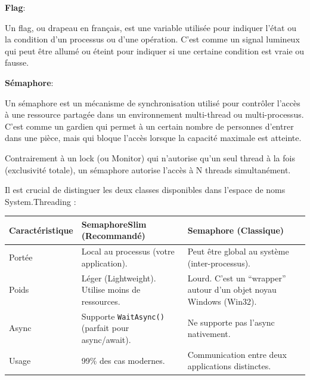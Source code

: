 \vspace{0.5cm}

\noindent \textbf{Flag}:

\noindent Un flag, ou drapeau en français, est une variable utilisée pour indiquer l'état ou la condition d'un processus ou d'une opération. C'est comme un signal lumineux qui peut être allumé ou éteint pour indiquer si une certaine condition est vraie ou fausse.

\newpage

\noindent \textbf{Sémaphore}:

\noindent Un sémaphore est un mécanisme de synchronisation utilisé pour contrôler l'accès à une ressource partagée dans un environnement multi-thread ou multi-processus. C'est comme un gardien qui permet à un certain nombre de personnes d'entrer dans une pièce, mais qui bloque l'accès lorsque la capacité maximale est atteinte.

\noindent Contrairement à un lock (ou Monitor) qui n'autorise qu'un seul thread à la fois (exclusivité totale), un sémaphore autorise l'accès à N threads simultanément.

\vspace{0.5cm}

\noindent Il est crucial de distinguer les deux classes disponibles dans l'espace de noms System.Threading :

\vspace{0.5cm}

\begin{center}
\begin{tabular}{|p{}|p{}|p{}|}
\hline
\textbf{Caractéristique} & \textbf{SemaphoreSlim (Recommandé)} & \textbf{Semaphore (Classique)} \\ \hline
Portée & Local au processus (votre application). & Peut être global au système (inter-processus). \\ \hline
Poids & Léger (Lightweight). Utilise moins de ressources. & Lourd. C'est un ``wrapper'' autour d'un objet noyau Windows (Win32). \\ \hline
Async & Supporte \texttt{WaitAsync()} (parfait pour async/await). & Ne supporte pas l'async nativement. \\ \hline
Usage & 99\% des cas modernes. & Communication entre deux applications distinctes. \\ \hline
\end{tabular}
\end{center}

\vspace{0.5cm}

